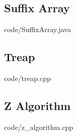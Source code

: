 \documentclass [landscape,10pt,a4paper,twocolumn,nofonts]{article}
\begin{document}
\subsection{Suffix Array}
 {code/SuffixArray.java}
\subsection{Treap}
 {code/treap.cpp}
\subsection{Z Algorithm}
 {code/z_algorithm.cpp}
\newpage

\end{document}
